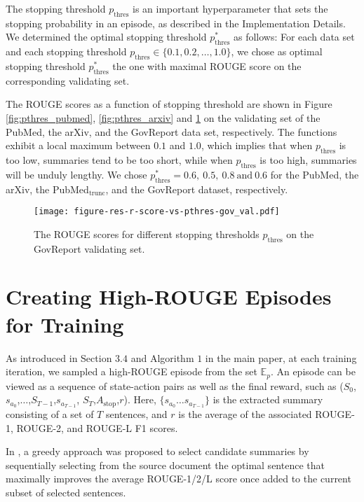 \documentclass[11pt]{article}
\begin{document}
The stopping threshold $p_{\text{thres}}$ is an important hyperparameter that sets the stopping probability in an episode, as described in the Implementation Details. We determined the optimal stopping threshold $p^*_{\text{thres}}$ as follows: For each data set and each stopping threshold $p_{\text{thres}}\in\{ 0.1, 0.2,\dots,1.0\}$, we chose as optimal stopping threshold $p^*_{\text{thres}}$ the one with maximal ROUGE score on the corresponding validating set. 

The ROUGE scores as a function of stopping threshold are shown in Figure \ref{fig:pthres_pubmed}, \ref{fig:pthres_arxiv} and \ref{fig:pthres_govreport} on the validating set of the PubMed, the arXiv, and the GovReport data set, respectively. The functions exhibit a local maximum between $0.1$ and $1.0$, which implies that when $p_\text{thres}$ is too low, summaries tend to be too short, while when $p_\text{thres}$ is too high, summaries will be unduly lengthy. We chose $p^*_{\text{thres}}=0.6,\ 0.5,\ 0.8\ \text{and}\ 0.6$ for the PubMed, the arXiv, the PubMed$_\text{trunc}$, and the GovReport dataset, respectively.

\begin{figure}[ht]
\centering
  \texttt{[image: figure-res-r-score-vs-pthres-gov\_val.pdf]}
  \caption{The ROUGE scores for different stopping thresholds $p_\text{thres}$ on the GovReport validating set.}
  \label{fig:pthres_govreport}
\end{figure}


\section{Creating High-ROUGE Episodes for Training}
\label{sec:high_rouge}
As introduced in Section $3.4$ and Algorithm $1$ in the main paper, at each training iteration, we sampled a high-ROUGE episode from the set $\mathbb{E}_p$. An episode can be viewed as a sequence of state-action pairs as well as the final reward, such as  ($S_0$,$s_{a_0}$,$\dots$,$S_{T-1}$,$s_{a_{T-1}}$, $S_{T}$,$A_{\text{stop}}$,$r$). Here, $\{s_{a_0}\dots  s_{a_{T-1}}\}$ is the extracted summary consisting of a set of $T$ sentences, and $r$ is the average of the associated ROUGE-1, ROUGE-2, and ROUGE-L F1 scores.

In \cite{nallapati2016summarunner}, a greedy approach was proposed to select candidate summaries by sequentially selecting from the source document the optimal sentence that maximally improves the average ROUGE-1/2/L score once added to the current subset of selected sentences.
\end{document}
